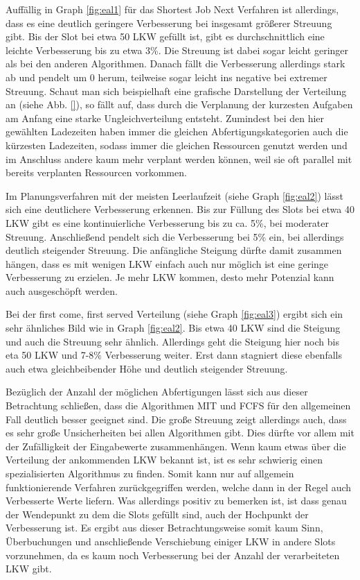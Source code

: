 Auffällig in Graph \ref{fig:eal1} für das Shortest Job Next Verfahren ist allerdings, dass es eine deutlich geringere Verbesserung bei insgesamt größerer Streuung gibt. Bis der Slot bei etwa 50 LKW gefüllt ist, gibt es durchschnittlich eine leichte Verbesserung bis zu etwa 3\%. Die Streuung ist dabei sogar leicht geringer als bei den anderen Algorithmen. Danach fällt die Verbesserung allerdings stark ab und pendelt um 0 herum, teilweise sogar leicht ins negative bei extremer Streuung. Schaut man sich beispielhaft eine grafische Darstellung der Verteilung an (siehe Abb. \ref{}), so fällt auf, dass durch die Verplanung der kurzesten Aufgaben am Anfang eine starke Ungleichverteilung entsteht. Zumindest bei den hier gewählten Ladezeiten haben immer die gleichen Abfertigungskategorien auch die kürzesten Ladezeiten, sodass immer die gleichen Ressourcen genutzt werden und im Anschluss andere kaum mehr verplant werden können, weil sie oft parallel mit bereits verplanten Ressourcen vorkommen.

Im Planungsverfahren mit der meisten Leerlaufzeit (siehe Graph \ref{fig:eal2}) lässt sich eine deutlichere Verbesserung erkennen. Bis zur Füllung des Slots bei etwa 40 LKW gibt es eine kontinuierliche Verbesserung bis zu ca. 5\%, bei moderater Streuung. Anschließend pendelt sich die Verbesserung bei 5\% ein, bei allerdings deutlich steigender Streuung. Die anfängliche Steigung dürfte damit zusammen hängen, dass es mit wenigen LKW einfach auch nur möglich ist eine geringe Verbesserung zu erzielen. Je mehr LKW kommen, desto mehr Potenzial kann auch ausgeschöpft werden.

Bei der first come, first served Verteilung (siehe Graph \ref{fig:eal3}) ergibt sich ein sehr ähnliches Bild wie in Graph \ref{fig:eal2}. Bis etwa 40 LKW sind die Steigung und auch die Streuung sehr ähnlich. Allerdings geht die Steigung hier noch bis eta 50 LKW und 7-8\% Verbesserung weiter. Erst dann stagniert diese ebenfalls auch etwa gleichbeibender Höhe und deutlich steigender Streuung.

Bezüglich der Anzahl der möglichen Abfertigungen lässt sich aus dieser Betrachtung schließen, dass die Algorithmen MIT und FCFS für den allgemeinen Fall deutlich besser geeignet sind. Die große Streuung zeigt allerdings auch, dass es sehr große Unsicherheiten bei allen Algorithmen gibt. Dies dürfte vor allem mit der Zufälligkeit der Eingabewerte zusammenhängen. Wenn kaum etwas über die Verteilung der ankommenden LKW bekannt ist, ist es sehr schwierig einen spezialisierten Algorithmus zu finden. Somit kann nur auf allgemein funktionierende Verfahren zurückgegriffen werden, welche dann in der Regel auch Verbesserte Werte liefern. Was allerdings positiv zu bemerken ist, ist dass genau der Wendepunkt zu dem die Slots gefüllt sind, auch der Hochpunkt der Verbesserung ist. Es ergibt aus dieser Betrachtungsweise somit kaum Sinn, Überbuchungen und anschließende Verschiebung einiger LKW in andere Slots vorzunehmen, da es kaum noch Verbesserung bei der Anzahl der verarbeiteten LKW gibt.



